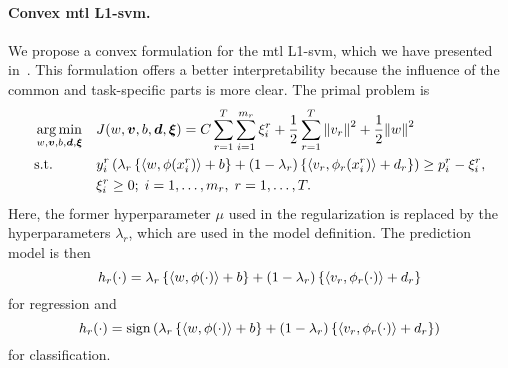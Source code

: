 \paragraph*{{Convex} \acrshort{mtl} L1-\acrshort{svm}.\\}
We propose a convex formulation for the \acrshort{mtl} L1-\acrshort{svm}, which we have presented in~\cite{RuizAD19}. This formulation offers a better interpretability because the influence of the common and task-specific parts is more clear. 
%
The primal problem is
\begin{equation}\label{eq:svmmtl_primal_convex}
    \begin{aligned}
    & \argmin_{w, \fv{v}, b, \fv{d}, \fv{\xi}}
    & & {J({w}, \fv{v}, b, \fv{d}, \fv{\xi}) = C \sum_{r= 1}^T \sum_{i=1}^{m_r} {\xi_{i}^r} + \frac{1}{2} \sum_{r= 1}^T{\norm{{v}_r}^2} + \frac{1}{2} {\norm{{w}}}^2} \\
    & \text{s.t.}
    & & y_{i}^r \left(\lambda_r \left\lbrace \dotp{w}{\phi(x_{i}^r)} + b  \right\rbrace + (1 - \lambda_r) \left\lbrace \dotp{{v}_r}{\phi_r(x_{i}^r)} + d_r \right\rbrace  \right) \geq p_{i}^r - \xi_{i}^r ,  \\
    & & & \xi_{i}^r \geq 0; \;  i=1 , \dotsc , m_r, \;  r= 1,\dotsc, T  . \\
    \end{aligned}
\end{equation}
Here, the former hyperparameter $\mu$ used in the regularization is replaced by the hyperparameters $\lambda_r$, which are used in the model definition. The prediction model is then
\begin{equation}
    \nonumber
    h_r({\cdot}) = \lambda_r \left\lbrace \left\langle w, \phi(\cdot) \right\rangle + b  \right\rbrace + (1 - \lambda_r) \left\lbrace \left\langle {v}_r, \phi_r(\cdot) \right\rangle + d_r \right\rbrace
\end{equation}
for regression and 
\begin{equation}
    \nonumber
    h_r({\cdot}) = \operatorname{sign}{ \left(\lambda_r \left\lbrace \left\langle w, \phi(\cdot) \right\rangle + b  \right\rbrace + (1 - \lambda_r) \left\lbrace \left\langle {v}_r, \phi_r(\cdot) \right\rangle + d_r \right\rbrace \right)}
\end{equation}
for classification.
%


